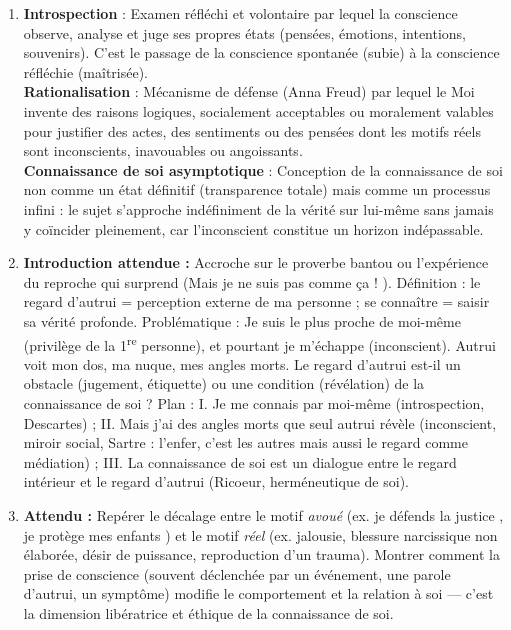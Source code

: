 \documentclass[11pt]{article}
\begin{document}
\begin{corrige}
\begin{enumerate}
\item \textbf{Introspection} : Examen réfléchi et volontaire par lequel la conscience observe, analyse et juge ses propres états (pensées, émotions, intentions, souvenirs). C'est le passage de la conscience spontanée (subie) à la conscience réfléchie (maîtrisée).\\
\textbf{Rationalisation} : Mécanisme de défense (Anna Freud) par lequel le Moi invente des raisons logiques, socialement acceptables ou moralement valables pour justifier des actes, des sentiments ou des pensées dont les motifs réels sont inconscients, inavouables ou angoissants.\\
\textbf{Connaissance de soi asymptotique} : Conception de la connaissance de soi non comme un état définitif (transparence totale) mais comme un processus infini : le sujet s'approche indéfiniment de la vérité sur lui-même sans jamais y coïncider pleinement, car l'inconscient constitue un horizon indépassable.
\item \textbf{Introduction attendue :} Accroche sur le proverbe bantou ou l'expérience du reproche qui surprend (\guillemotleft Mais je ne suis pas comme ça ! \guillemotright). Définition : le regard d'autrui = perception externe de ma personne ; se connaître = saisir sa vérité profonde. Problématique : Je suis le plus proche de moi-même (privilège de la 1\textsuperscript{re} personne), et pourtant je m'échappe (inconscient). Autrui voit mon dos, ma nuque, mes angles morts. Le regard d'autrui est-il un obstacle (jugement, étiquette) ou une condition (révélation) de la connaissance de soi ? Plan : I. Je me connais par moi-même (introspection, Descartes) ; II. Mais j'ai des angles morts que seul autrui révèle (inconscient, miroir social, Sartre : \guillemotleft l'enfer, c'est les autres \guillemotright mais aussi le regard comme médiation) ; III. La connaissance de soi est un dialogue entre le regard intérieur et le regard d'autrui (Ricoeur, herméneutique de soi).
\item \textbf{Attendu :} Repérer le décalage entre le motif \emph{avoué} (ex. \guillemotleft je défends la justice \guillemotright, \guillemotleft je protège mes enfants \guillemotright) et le motif \emph{réel} (ex. jalousie, blessure narcissique non élaborée, désir de puissance, reproduction d'un trauma). Montrer comment la prise de conscience (souvent déclenchée par un événement, une parole d'autrui, un symptôme) modifie le comportement et la relation à soi — c'est la dimension libératrice et éthique de la connaissance de soi.
\end{enumerate}
\end{corrige}
\end{document}
